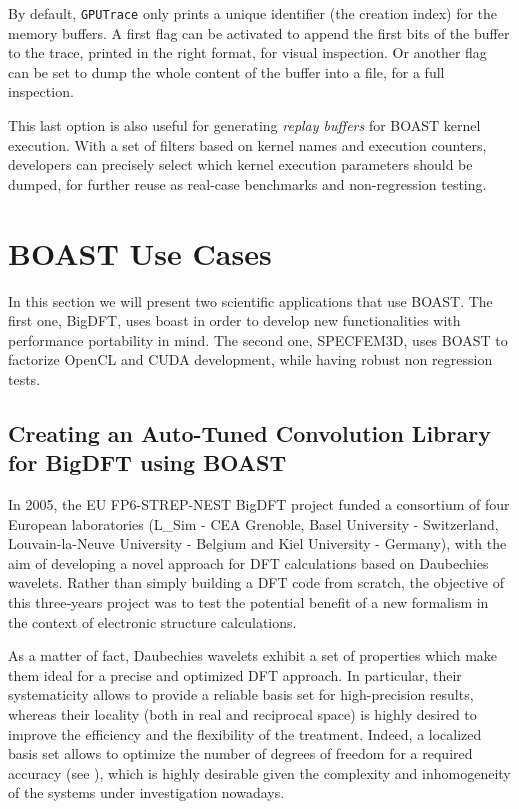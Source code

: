 \documentclass[11pt, a4paper, twoside]{montblanc}
\newcommand{\code}[1]{\texttt{#1}}
\begin{document}
By default, \code{GPUTrace} only prints a unique identifier (the
creation index) for the memory buffers. A first flag can be activated
to append the first bits of the buffer to the trace, printed in the
right format, for visual inspection. Or another flag can be set to
dump the whole content of the buffer into a file, for a full
inspection.

This last option is also useful for generating \emph{replay buffers}
for BOAST kernel execution. With a set of filters based on kernel
names and execution counters, developers can precisely select which
kernel execution parameters should be dumped, for further reuse as
real-case benchmarks and non-regression testing.

\section{BOAST Use Cases}
\label{use_cases}

In this section we will present two scientific applications that use BOAST. The
first one, BigDFT, uses boast in order to develop new functionalities with
performance portability in mind. The second one, SPECFEM3D, uses BOAST to
factorize OpenCL and CUDA development, while having robust non regression
tests.

  \subsection{Creating an Auto-Tuned Convolution Library for BigDFT using
BOAST}

In 2005, the EU FP6-STREP-NEST BigDFT project funded a consortium of
four European laboratories (L\_Sim - CEA Grenoble, Basel University -
Switzerland, Louvain-la-Neuve University - Belgium and Kiel University -
Germany), with the aim of developing a novel approach for DFT calculations
based on Daubechies wavelets.  Rather than simply building a DFT code from
scratch, the objective of this three-years project was to test the potential
benefit of a new formalism in the context of electronic structure calculations.

As a matter of fact, Daubechies wavelets exhibit a set of properties which make
them ideal for a precise and optimized DFT approach. In particular, their
systematicity allows to provide a reliable basis set for high-precision
results, whereas their locality (both in real and reciprocal space) is highly
desired to improve the efficiency and the flexibility of the treatment. Indeed,
a localized basis set allows to optimize the number of degrees of freedom for a
required accuracy (see \cite{bigdft}), which is highly desirable given the
complexity and inhomogeneity of the systems under investigation nowadays.
\end{document}
